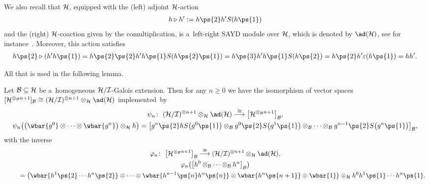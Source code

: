 We also recall that ${\cal H}$, equipped with the (left) adjoint ${\cal H}$-action
\begin{gather}
\label{HonM}
h\triangleright h':=h\ps{2}h'S(h\ps{1})
\end{gather}
and the (right) ${\cal H}$-coaction given by the comultiplication, is a~left-right SAYD module over ${\cal H}$, which is
denoted by $\ad({\cal H})$, see for instance~\cite[Example~4.3]{JaraStef06}.
Moreover, this action satisf\/ies
\begin{gather}
\label{HonH}
h\ps{2}\triangleright (h'h\ps{1}) =h\ps{2}\ps{2}h'h\ps{1}S(h\ps{2}\ps{1})
=h\ps{3}h'h\ps{1}S(h\ps{2}) =h\ps{2}h'\varepsilon(h\ps{1}) =hh'.
\end{gather}

All that is used in the following lemma.

\begin{Lemma}
Let ${\cal B}\subseteq {\cal H}$ be a~homogeneous ${\cal H}/{\cal I}$-Galois extension.
Then for any $n \geq 0$ we have the isomorphism of vector spaces $[{\cal H}^{\otimes_{\cal B} n+1}]_{{\cal
B}} \cong ({\cal H}/{\cal I})^{\otimes n+1} \otimes_{\cal H} \ad({\cal H})$ implemented~by
\begin{gather}
\psi_n\colon \  ({\cal H}/{\cal I})^{\otimes n+1} \otimes_{\cal H} \ad({\cal H})\stackrel{\cong}{\longrightarrow}
\big[{\cal H}^{\otimes_{\cal B} n+1}\big]_{\cal B},
\label{aux-map-psi}
\\
\psi_n\big(\big(\wbar{g^0}\otimes\cdots\otimes \wbar{g^n}\big)\otimes_{\cal H} h \big)
=\big[g^n\ps{2}hS\big(g^0\ps{1}\big) \otimes_{\cal B} g^0\ps{2}S\big(g^1\ps{1}\big) \otimes_{\cal B} \cdots \otimes_{\cal B}g^{n-1}\ps{2}S\big(g^n\ps{1}\big)\big]_{\cal B},
\nonumber
\end{gather}
with the inverse
\begin{gather}
\varphi_n\colon \ \big[{\cal H}^{\otimes_{\cal B} n+1}\big]_{{\cal B}} \stackrel{\cong}{\longrightarrow} ({\cal H}/{\cal
I})^{\otimes n+1} \otimes_{\cal H} \ad({\cal H}),
\nonumber
\\
\varphi_n\big(\big[h^0\otimes_{\cal B}\cdots\otimes_{\cal B} h^n\big]_{\cal B} \big)\nonumber\\
\qquad{}
=\big(\wbar{h^1\ps{2}\cdots h^n\ps{2}} \otimes\cdots\otimes \wbar{h^{n-1}\ps{n}h^n\ps{n}}
\otimes
\wbar{h^n\ps{n+1}} \otimes \wbar{1}\big) \otimes_{\cal H} h^0h^1\ps{1}\cdots h^n\ps{1}.
\label{aux-map-vp}
\end{gather}
\end{Lemma}

